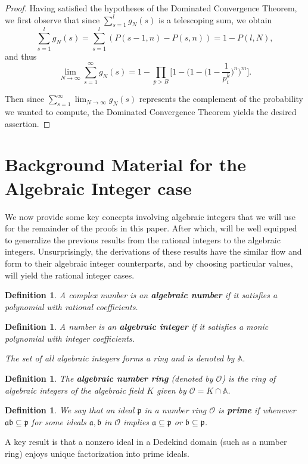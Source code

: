 \documentclass[12pt]{amsart}
\newtheorem{definition}[theorem]{Definition}
\theoremstyle{definition}
\newcommand{\f}[1]{\mathfrak{#1}}
\begin{document}
\begin{proof}
	Having satisfied the hypotheses of the Dominated Convergence Theorem, we first observe that since $\sum_{s=1}^l g_N(s)$ is a telescoping sum, we obtain
	$$\sum_{s=1}^l g_N(s) = \sum_{s=1}^l (P(s-1, n) - P(s, n)) = 1 - P(l, N),$$ 
	and thus
	$$\lim_{N \to \infty} \sum_{s=1}^{\infty} g_N(s) = 1 - \prod_{p > B} \Big[1 - \Big(1 - \Big(1 - \frac{1}{p^k_i}  \Big)^n\Big)^m\Big].$$
	
	\noindent Then since $\displaystyle \sum_{s=1}^{\infty} \lim_{N \to \infty} g_N(s)$ represents the complement of the probability we wanted to compute, the Dominated Convergence Theorem yields the desired assertion.
\end{proof}



\section{Background Material for the Algebraic Integer case}
We now provide some key concepts involving algebraic integers that we will use for the remainder of the proofs in this paper. After which, will be well equipped to generalize the previous results from the rational integers to the algebraic integers. Unsurprisingly, the derivations of these results have the similar flow and form to their algebraic integer counterparts, and by choosing particular values, will yield the rational integer cases.


\begin{definition} A complex number is an \textbf{algebraic number} if it satisfies a polynomial with rational coefficients.
\end{definition}

\begin{definition}A number is an \textbf{algebraic integer} if it satisfies a monic polynomial with integer coefficients.
	
	The set of all algebraic integers forms a ring and is denoted by \(\mathbb{A}\).
\end{definition}

\begin{definition} The \textbf{algebraic number ring} (denoted by \(\mathcal{O}\)) is the ring of algebraic integers of the algebraic field \(K\) given by \(\mathcal{O}=K\cap \mathbb{A}\). 
\end{definition}

\begin{definition} 
	We say that an ideal \(\f{p}\) in a number ring $\mathcal{O}$ is \textbf{prime} if whenever \(\f{ab}\subseteq \f{p}\) for some ideals \(\f{a},\f{b}\) in $\mathcal{O}$ implies \(\f{a}\subseteq \f{p}\) or \(\f{b} \subseteq \f{p}\).  
\end{definition}
A key result is that a nonzero ideal in a Dedekind domain (such as a number ring) enjoys unique factorization into prime ideals. 
\end{document}
